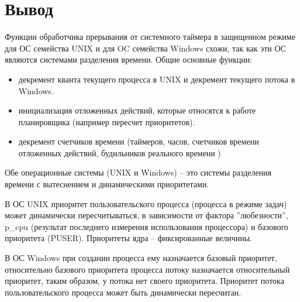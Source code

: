 \chapter{Вывод}
Функции обработчика прерывания от системного таймера в защищенном режиме для ОС семейства UNIX и для OC семейства Windows схожи, так как эти ОС являются системами разделения времени. Общие основные функции:
\begin{itemize}
	\item декремент кванта текущего процесса в UNIX и декремент текущего потока в Windows.
	\item инициализация отложенных действий, которые относятся к работе планировщика (например пересчет приоритетов).
	\item декремент счетчиков времени (таймеров, часов, счетчиков времени отложенных действий, будильников реального времени ) 
\end{itemize}

Обе операционные системы (UNIX и Windows) -- это системы разделения времени с вытеснением и динамическими приоритетами.

В ОС UNIX приоритет пользовательского процесса (процесса в режиме задач) может динамически пересчитываться, в зависимости от фактора ''любезности'', p\_cpu (результат последнего измерения использования процессора) и базового приоритета (PUSER). Приоритеты ядра -- фиксированные величины.

В ОС Windows при создании процесса ему назначается базовый приоритет, относительно базового приоритета процесса потоку назначается относительный приоритет, таким образом, у потока нет своего приоритета. Приоритет потока пользовательского процесса может быть динамически пересчитан.








